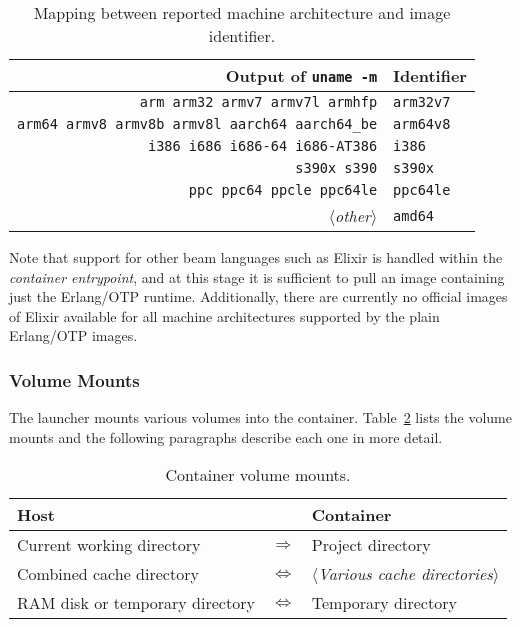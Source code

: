 \begin{table}[h]
  \setlength{\tabcolsep}{10pt}
  \centering
  \begin{tabular}{ r l }
    Output of \lstinline|uname -m| & Identifier \\
    \hline
    \lstinline|arm arm32 armv7 armv7l armhfp| & \lstinline|arm32v7| \\
    \lstinline|arm64 armv8 armv8b armv8l aarch64 aarch64_be| & \lstinline|arm64v8| \\
    \lstinline|i386 i686 i686-64 i686-AT386| & \lstinline|i386| \\
    \lstinline|s390x s390| & \lstinline|s390x| \\
    \lstinline|ppc ppc64 ppcle ppc64le| & \lstinline|ppc64le| \\
    $\langle$\emph{other}$\rangle$ & \lstinline|amd64| \\
  \end{tabular}
  \caption{Mapping between reported machine architecture and image identifier.}\label{table:architectures}
\end{table}

Note that support for other \acrshort{beam} languages such as Elixir is handled within the \emph{container entrypoint}, and at this stage it is sufficient to pull an image containing just the Erlang/OTP runtime. Additionally, there are currently no official images of Elixir available for all machine architectures supported by the plain Erlang/OTP images.

\subsubsection{Volume Mounts}
The launcher mounts various volumes into the container. Table~\ref{table:volumes} lists the volume mounts and the following paragraphs describe each one in more detail.

\begin{table}[h]
  \setlength{\tabcolsep}{10pt}
  \centering
  \begin{tabular}{ l c l }
    Host & & Container \\
    \hline
    Current working directory &
      $\Longrightarrow$ &
      Project directory \\
    Combined cache directory &
      $\Longleftrightarrow$ &
      $\langle$\emph{Various cache directories}$\rangle$ \\
    RAM disk or temporary directory &
      $\Longleftrightarrow$ &
      Temporary directory \\
  \end{tabular}
  \caption{Container volume mounts.}\label{table:volumes}
\end{table}

